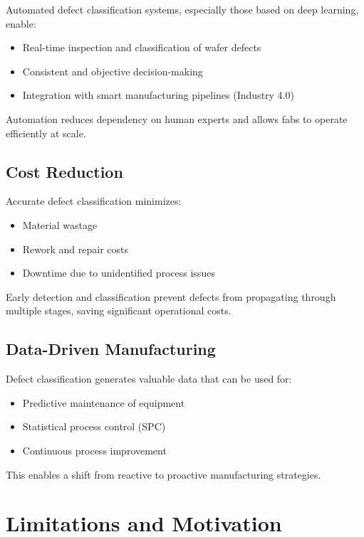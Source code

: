 Automated defect classification systems, especially those based on deep learning, enable:
\begin{itemize}
\item Real-time inspection and classification of wafer defects
\item Consistent and objective decision-making
\item Integration with smart manufacturing pipelines (Industry 4.0)
\end{itemize} 
Automation reduces dependency on human experts and allows fabs to operate efficiently at scale.

\subsection {Cost Reduction}

Accurate defect classification minimizes:
\begin{itemize}
\item Material wastage
\item Rework and repair costs
\item Downtime due to unidentified process issues
\end{itemize}
Early detection and classification prevent defects from propagating through multiple stages, saving significant operational costs.

\subsection {Data-Driven Manufacturing}

Defect classification generates valuable data that can be used for:
\begin{itemize}
\item Predictive maintenance of equipment
\item Statistical process control (SPC)
\item Continuous process improvement
\end{itemize} 

This enables a shift from reactive to proactive manufacturing strategies.
\section {Limitations and Motivation}
